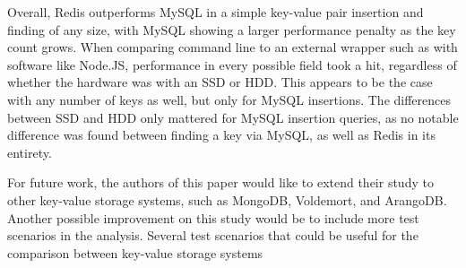 \documentclass[letterpaper, 10 pt, conference]{ieeeconf}
\begin{document}
\begin{table}[h]

\caption{Performance of MySQL and Redis on HDD and SSDs with 100000 keys in all queries (in seconds)}
\end{table}
Overall, Redis outperforms MySQL in a simple key-value pair insertion and finding of any size, with MySQL showing a larger performance penalty as the key count grows. When comparing command line to an external wrapper such as with software like Node.JS, performance in every possible field took a hit, regardless of whether the hardware was with an SSD or HDD. This appears to be the case with any number of keys as well, but only for MySQL insertions. The differences between SSD and HDD only mattered for MySQL insertion queries, as no notable difference was found between finding a key via MySQL, as well as Redis in its entirety.

For future work, the authors of this paper would like to extend their study to other key-value storage systems, such as MongoDB, Voldemort, and ArangoDB. Another possible improvement on this study would be to include more test scenarios in the analysis. Several test scenarios that could be useful for the comparison between key-value storage systems 
\end{document}
